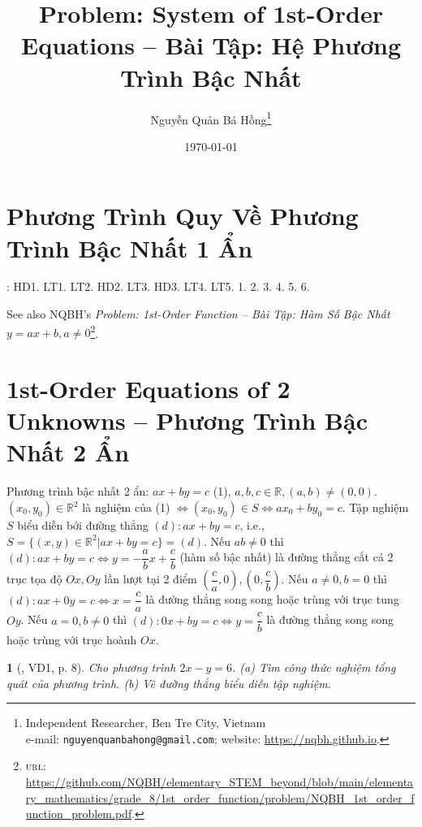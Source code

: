\documentclass{article}
\title{Problem: System of 1st-Order Equations -- Bài Tập: Hệ Phương Trình Bậc Nhất}
\author{Nguyễn Quản Bá Hồng\footnote{Independent Researcher, Ben Tre City, Vietnam\\e-mail: \texttt{nguyenquanbahong@gmail.com}; website: \url{https://nqbh.github.io}.}}
\date{\today}
\newtheorem{baitoan}{}
\begin{document}
\maketitle
\tableofcontents


\section{Phương Trình Quy Về Phương Trình Bậc Nhất 1 Ẩn}
\cite[\S1, pp. 5--11]{SGK_Toan_9_Canh_Dieu_tap_1}: HD1. LT1. LT2. HD2. LT3. HD3. LT4. LT5. 1. 2. 3. 4. 5. 6.

See also NQBH's \textit{Problem: 1st-Order Function -- Bài Tập: Hàm Số Bậc Nhất $y = ax + b,a\ne0$}\footnote{\textsc{url}: \url{https://github.com/NQBH/elementary_STEM_beyond/blob/main/elementary_mathematics/grade_8/1st_order_function/problem/NQBH_1st_order_function_problem.pdf}.}.


\section{1st-Order Equations of 2 Unknowns -- Phương Trình Bậc Nhất 2 Ẩn}
 Phương trình bậc nhất 2 ẩn: $ax + by = c$ (1), $a,b,c\in\mathbb{R},(a,b)\ne(0,0)$.  $(x_0,y_0)\in\mathbb{R}^2$ là nghiệm của (1) $\Leftrightarrow(x_0,y_0)\in S\Leftrightarrow ax_0 + by_0 = c$.  Tập nghiệm $S$ biểu diễn bởi đường thẳng $(d):ax + by = c$, i.e., $S = \{(x,y)\in\mathbb{R}^2|ax + by = c\} = (d)$.  Nếu $ab\ne0$ thì $(d):ax + by = c\Leftrightarrow y = -\dfrac{a}{b}x + \dfrac{c}{b}$ (hàm số bậc nhất) là đường thẳng cắt cả 2 trục tọa độ $Ox,Oy$ lần lượt tại 2 điểm $\left(\dfrac{c}{a},0\right),\left(0,\dfrac{c}{b}\right)$.  Nếu $a\ne0,b = 0$ thì $(d):ax + 0y = c\Leftrightarrow x = \dfrac{c}{a}$ là đường thẳng song song hoặc trùng với trục tung $Oy$.  Nếu $a = 0,b\ne0$ thì $(d):0x + by = c\Leftrightarrow y = \dfrac{c}{b}$ là đường thẳng song song hoặc trùng với trục hoành $Ox$.

\begin{baitoan}[\cite{Binh_boi_duong_Toan_9_tap_2}, VD1, p. 8]
	Cho phương trình $2x - y = 6$. (a) Tìm công thức nghiệm tổng quát của phương trình. (b) Vẽ đường thẳng biểu diễn tập nghiệm.
\end{baitoan}
\end{document}
